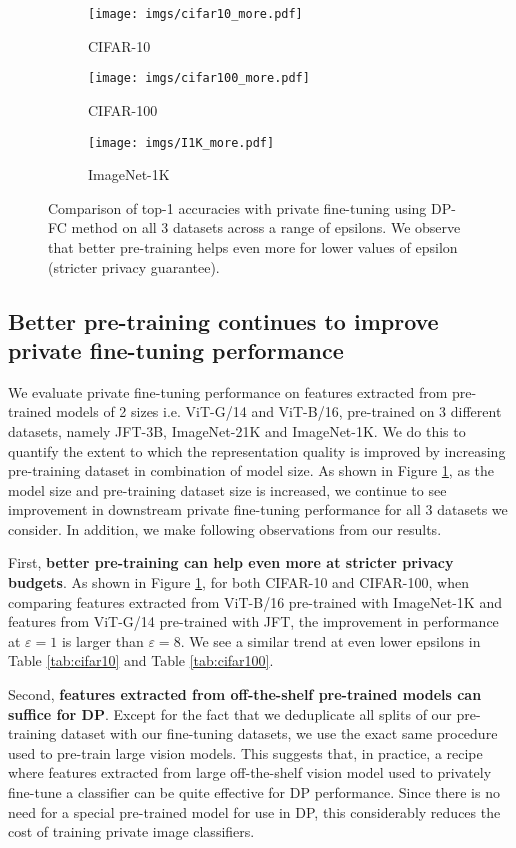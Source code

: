 \documentclass[letterpaper]{article} \usepackage{fullpage}
\renewcommand{\epsilon}{\varepsilon}
\begin{document}
\begin{figure}[h!]
  \centering
      \begin{subfigure}[b]{0.32\textwidth}
    \texttt{[image: imgs/cifar10\_more.pdf]}
    \caption{CIFAR-10}
  \end{subfigure}
    \begin{subfigure}[b]{0.32\textwidth}
    \texttt{[image: imgs/cifar100\_more.pdf]}
    \caption{CIFAR-100}
  \end{subfigure}
    \begin{subfigure}[b]{0.32\textwidth}
    \texttt{[image: imgs/I1K\_more.pdf]}
    \caption{ImageNet-1K}
    \end{subfigure}
  \caption{Comparison of top-1 accuracies with private fine-tuning using DP-FC method on all 3 datasets across a range of epsilons. We observe that better pre-training helps even more for lower values of epsilon (stricter privacy guarantee).}
  \label{fig:better_pretraining}
\end{figure}
\subsection{Better pre-training continues to improve private fine-tuning performance}
We evaluate private fine-tuning performance on features extracted from pre-trained models of 2 sizes i.e. ViT-G/14 and ViT-B/16, pre-trained on 3 different datasets, namely JFT-3B, ImageNet-21K and ImageNet-1K. We do this to quantify the extent to which the representation quality is improved by increasing pre-training dataset in combination of model size. As shown in Figure \ref{fig:better_pretraining}, as the model size and pre-training dataset size is increased, we continue to see improvement in downstream private fine-tuning performance for all 3 datasets we consider. In addition, we make following observations from our results.

First, \textbf{better pre-training can help even more at stricter privacy budgets}. As shown in Figure \ref{fig:better_pretraining}, for both CIFAR-10 and CIFAR-100, when comparing features extracted from ViT-B/16 pre-trained with ImageNet-1K and features from ViT-G/14 pre-trained with JFT, the improvement in performance at $\epsilon=1$ is larger than $\epsilon=8$. We see a similar trend at even lower epsilons in Table \ref{tab:cifar10} and Table \ref{tab:cifar100}.

Second, \textbf{features extracted from off-the-shelf pre-trained models can suffice for DP}. Except for the fact that we deduplicate all splits of our pre-training dataset with our fine-tuning datasets, we use the exact same procedure used to pre-train large vision models. This suggests that, in practice, a recipe where features extracted from large off-the-shelf vision model used to privately fine-tune a classifier can be quite effective for DP performance. Since there is no need for a special pre-trained model for use in DP, this considerably reduces the cost of training private image classifiers.
\end{document}
